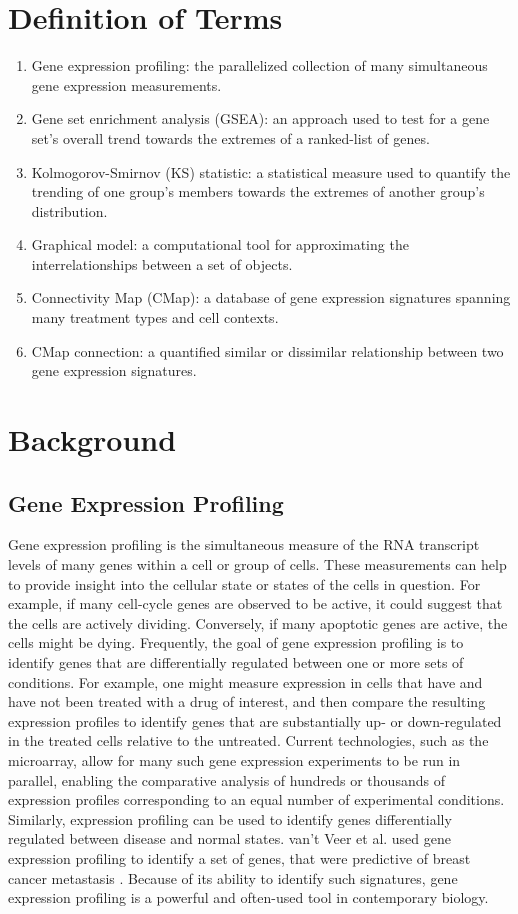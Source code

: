 \documentclass[12pt]{article}
\begin{document}
\section{Definition of Terms}
\begin{enumerate}
\item Gene expression profiling: the parallelized collection of many simultaneous gene expression measurements.
\item Gene set enrichment analysis (GSEA): an approach used to test for a gene set's overall trend towards the extremes of a ranked-list of genes.
\item Kolmogorov-Smirnov (KS) statistic: a statistical measure used to quantify the trending of one group's members towards the extremes of another group's distribution.
\item Graphical model: a computational tool for approximating the interrelationships between a set of objects.
\item Connectivity Map (CMap): a database of gene expression signatures spanning many treatment types and cell contexts.
\item CMap connection: a quantified similar or dissimilar relationship between two gene expression signatures.
\end{enumerate}

\section{Background}
\subsection{Gene Expression Profiling}

Gene expression profiling is the simultaneous measure of the RNA transcript levels of many genes within a cell or group of cells. These measurements can help to provide insight into the cellular state or states of the cells in question. For example, if many cell-cycle genes are observed to be active, it could suggest that the cells are actively dividing. Conversely, if many apoptotic genes are active, the cells might be dying. Frequently, the goal of gene expression profiling is to identify genes that are differentially regulated between one or more sets of conditions. For example, one might measure expression in cells that have and have not been treated with a drug of interest, and then compare the resulting expression profiles to identify genes that are substantially up- or down-regulated in the treated cells relative to the untreated. Current technologies, such as the microarray, allow for many such gene expression experiments to be run in parallel, enabling the comparative analysis of hundreds or thousands of expression profiles corresponding to an equal number of experimental conditions. Similarly, expression profiling can be used to identify genes differentially regulated between disease and normal states. van't Veer et al. used gene expression profiling to identify a set of genes, that were predictive of breast cancer metastasis \cite{van_t_veer_gene_2002}. Because of its ability to identify such signatures, gene expression profiling is a powerful and often-used tool in contemporary biology.
\end{document}
